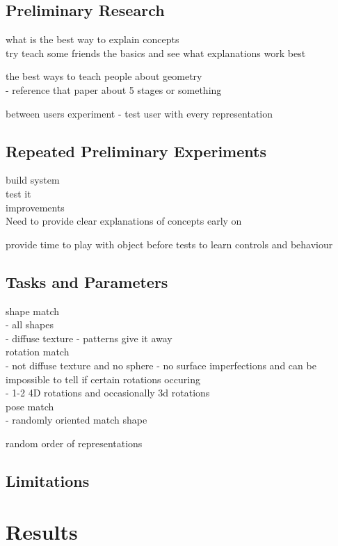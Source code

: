 \documentclass{l4proj}
\begin{document}
\subsection{Preliminary Research}

what is the best way to explain concepts\\
try teach some friends the basics and see what explanations work best

the best ways to teach people about geometry\\
 - reference that paper about 5 stages or something

between users experiment
 - test user with every representation

\subsection{Repeated Preliminary Experiments}

build system\\
test it\\
improvements\\

Need to provide clear explanations of concepts early on

provide time to play with object before tests to learn controls and behaviour

\subsection{Tasks and Parameters}

shape match\\
 - all shapes\\
 - diffuse texture - patterns give it away\\
rotation match\\
 - not diffuse texture and no sphere - no surface imperfections and can be impossible to tell if certain rotations occuring\\
 - 1-2 4D rotations and occasionally 3d rotations\\
pose match\\
 - randomly oriented match shape

random order of representations

\subsection{Limitations}

\section{Results}
\end{document}
